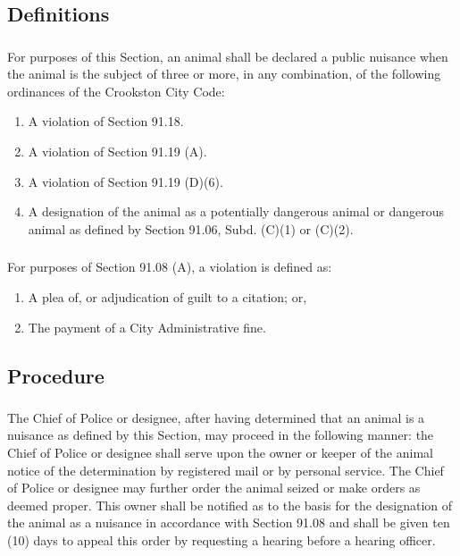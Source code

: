 \subsection{Definitions}
\subsubsection{}
For purposes of this Section, an animal shall be declared a public nuisance when the animal is the subject of three or more, in any combination, of the following ordinances of the Crookston City Code:
\begin{enumerate}[{\indent}a)]
    \item A violation of Section 91.18.
    \item A violation of Section 91.19 (A).
    \item A violation of Section 91.19 (D)(6).
    \item A designation of the animal as a potentially dangerous animal or dangerous animal as defined by Section 91.06, Subd. (C)(1) or (C)(2).
\end{enumerate}
\subsubsection{}
For purposes of Section 91.08 (A), a violation is defined as:
\begin{enumerate}[{\indent}a)]
    \item A plea of, or adjudication of guilt to a citation; or,
    \item The payment of a City Administrative fine.
\end{enumerate}
\subsection{Procedure}
\subsubsection{}
The Chief of Police or designee, after having determined that an animal is a nuisance as defined by this Section, may proceed in the following manner: the Chief of Police or designee shall serve upon the owner or keeper of the animal notice of the determination by registered mail or by personal service. The Chief of Police or designee may further order the animal seized or make orders as deemed proper. This owner shall be notified as to the basis for the designation of the animal as a nuisance in accordance with Section 91.08 and shall be given ten (10) days to appeal this order by requesting a hearing before a hearing officer.
